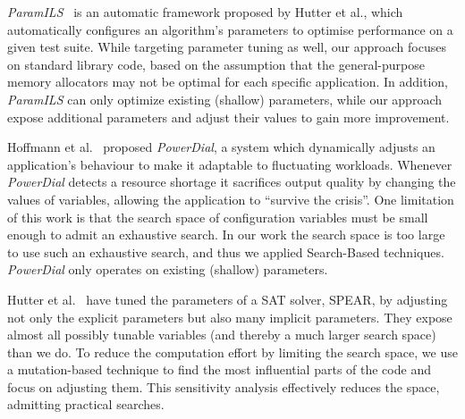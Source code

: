 \emph{ParamILS}~\cite{hutter2009paramils} is an automatic framework proposed by Hutter et al.,
which automatically configures an algorithm's parameters to optimise
performance on a given test suite. 
While
targeting parameter tuning as well, our approach focuses on standard
library code, based on the assumption that the general-purpose memory
allocators may not be optimal for each specific application. In addition,
\emph{ParamILS} can only optimize existing (shallow) parameters, while our
approach expose additional parameters and adjust their values to gain more
improvement.

Hoffmann et al.~\cite{Hoffmann:2011:DKR:1950365.1950390} proposed
\emph{PowerDial}, a system which dynamically adjusts an application's
behaviour to make it adaptable to fluctuating workloads. 
Whenever \emph{PowerDial} detects a resource shortage it sacrifices 
output quality by changing the values of variables, allowing
the application to ``survive the crisis''. One limitation of
this work is that the search space of configuration variables must be small
enough to admit an exhaustive search. In our work the search space is too
large to use such an exhaustive search, and thus we applied Search-Based
techniques. %
\emph{PowerDial} only operates
on existing (shallow) parameters. 

Hutter et al.~\cite{4401979} have tuned the parameters of a SAT
solver, SPEAR, by adjusting not only the explicit parameters but also many
implicit parameters. They expose almost all possibly tunable variables 
(and
thereby a much larger search space) than we do. 
To reduce the
computation effort by limiting the search space, we use a mutation-based
technique to find the most influential parts of the code and focus
on adjusting them. 
This sensitivity analysis effectively reduces the 
space, admitting practical searches.

